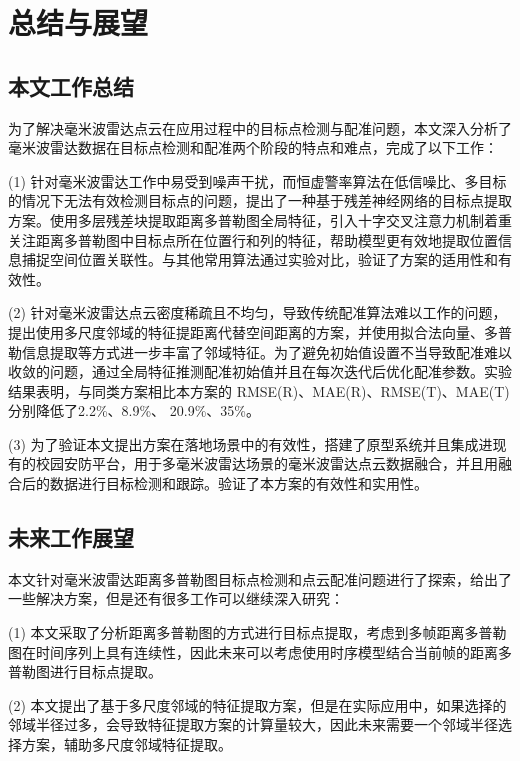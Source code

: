 \chapter{总结与展望}
\section{本文工作总结}
为了解决毫米波雷达点云在应用过程中的目标点检测与配准问题，本文深入分析了毫米波雷达数据在目标点检测和配准两个阶段的特点和难点，完成了以下工作：
\par
(1) 针对毫米波雷达工作中易受到噪声干扰，而恒虚警率算法在低信噪比、多目标的情况下无法有效检测目标点的问题，提出了一种基于残差神经网络的目标点提取方案。使用多层残差块提取距离多普勒图全局特征，引入十字交叉注意力机制着重关注距离多普勒图中目标点所在位置行和列的特征，帮助模型更有效地提取位置信息捕捉空间位置关联性。与其他常用算法通过实验对比，验证了方案的适用性和有效性。
\par
(2) 针对毫米波雷达点云密度稀疏且不均匀，导致传统配准算法难以工作的问题，提出使用多尺度邻域的特征提距离代替空间距离的方案，并使用拟合法向量、多普勒信息提取等方式进一步丰富了邻域特征。为了避免初始值设置不当导致配准难以收敛的问题，通过全局特征推测配准初始值并且在每次迭代后优化配准参数。实验结果表明，与同类方案相比本方案的 RMSE(R)、MAE(R)、RMSE(T)、MAE(T)分别降低了2.2\%、8.9\%、 20.9\%、35\%。
\par
(3) 为了验证本文提出方案在落地场景中的有效性，搭建了原型系统并且集成进现有的校园安防平台，用于多毫米波雷达场景的毫米波雷达点云数据融合，并且用融合后的数据进行目标检测和跟踪。验证了本方案的有效性和实用性。
\section{未来工作展望}
本文针对毫米波雷达距离多普勒图目标点检测和点云配准问题进行了探索，给出了一些解决方案，但是还有很多工作可以继续深入研究：
\par
(1) 本文采取了分析距离多普勒图的方式进行目标点提取，考虑到多帧距离多普勒图在时间序列上具有连续性，因此未来可以考虑使用时序模型结合当前帧的距离多普勒图进行目标点提取。
\par
(2) 本文提出了基于多尺度邻域的特征提取方案，但是在实际应用中，如果选择的邻域半径过多，会导致特征提取方案的计算量较大，因此未来需要一个邻域半径选择方案，辅助多尺度邻域特征提取。